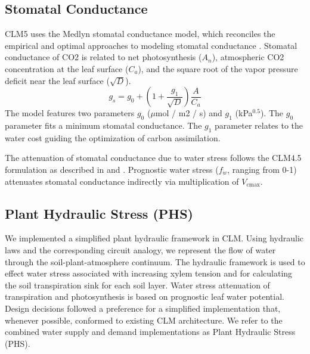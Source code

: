 \documentclass[draft,linenumbers]{agujournal}
\begin{document}
\subsection{Stomatal Conductance}
\label{sect:gs}
    CLM5 uses the Medlyn stomatal conductance model, which reconciles the empirical and optimal approaches to modeling 
    stomatal conductance \citep{medlyn2011}. 
    Stomatal conductance of CO2 is related to net photosynthesis ($A_n$), atmospheric CO2 concentration at the leaf surface 
    ($C_a$), and the square root of the vapor pressure deficit near the leaf surface ($\sqrt{D}$).
    \begin{equation}
    g_s=g_0+\left(1+\dfrac{g_1}{\sqrt{D}}\right)\dfrac{A}{C_a}
    \end{equation}
    The model features two parameters $g_0$ ($\mu$mol / m2 / s) and $g_1$ (kPa$^{0.5}$). The $g_0$ parameter fits a 
    minimum stomatal conductance. The $g_1$ parameter relates to the water cost guiding the optimization of carbon 
    assimilation.
    
    The attenuation of stomatal conductance due to water stress follows the CLM4.5 formulation as described in 
    \citet{oleson2013} and \citet{bonan2011}. Prognostic water stress ($f_w$, ranging from 0-1) attenuates stomatal 
    conductance indirectly via multiplication of $V_{\text{cmax}}$. 

\subsection{Plant Hydraulic Stress (PHS)}
  We implemented a simplified plant hydraulic framework in CLM. 
  Using hydraulic laws and the corresponding circuit analogy, we represent the 
  flow of water through the soil-plant-atmosphere continuum. 
  The hydraulic framework is used to effect water stress associated with increasing xylem tension
  and for calculating the soil transpiration sink for each soil layer. 
  Water stress attenuation of transpiration and photosynthesis is based on prognostic leaf water potential. 
  Design decisions followed a preference for a simplified implementation that,
  whenever possible, conformed to existing CLM architecture.
  We refer to the combined water supply and demand implementations as Plant Hydraulic Stress (PHS).
  
\end{document}
